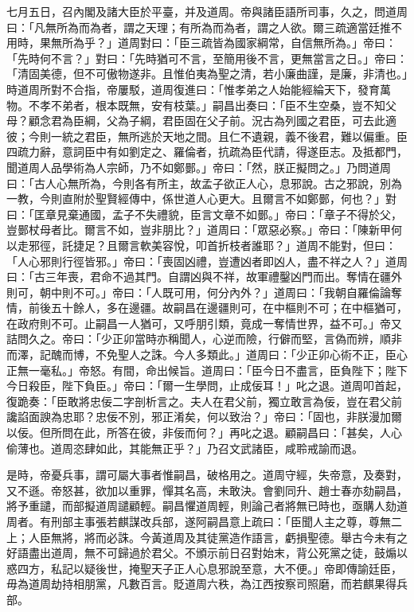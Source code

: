 \begin{pinyinscope}
七月五日，召內閣及諸大臣於平臺，并及道周。帝與諸臣語所司事，久之，問道周曰：「凡無所為而為者，謂之天理；有所為而為者，謂之人欲。爾三疏適當廷推不用時，果無所為乎？」道周對曰：「臣三疏皆為國家綱常，自信無所為。」帝曰：「先時何不言？」對曰：「先時猶可不言，至簡用後不言，更無當言之日。」帝曰：「清固美德，但不可傲物遂非。且惟伯夷為聖之清，若小廉曲謹，是廉，非清也。」時道周所對不合指，帝屢駁，道周復進曰：「惟孝弟之人始能經綸天下，發育萬物。不孝不弟者，根本既無，安有枝葉。」嗣昌出奏曰：「臣不生空桑，豈不知父母？顧念君為臣綱，父為子綱，君臣固在父子前。況古為列國之君臣，可去此適彼；今則一統之君臣，無所逃於天地之間。且仁不遺親，義不後君，難以偏重。臣四疏力辭，意詞臣中有如劉定之、羅倫者，抗疏為臣代請，得遂臣志。及抵都門，聞道周人品學術為人宗師，乃不如鄭鄤。」帝曰：「然，朕正擬問之。」乃問道周曰：「古人心無所為，今則各有所主，故孟子欲正人心，息邪說。古之邪說，別為一教，今則直附於聖賢經傳中，係世道人心更大。且爾言不如鄭鄤，何也？」對曰：「匡章見棄通國，孟子不失禮貌，臣言文章不如鄤。」帝曰：「章子不得於父，豈鄤杖母者比。爾言不如，豈非朋比？」道周曰：「眾惡必察。」帝曰：「陳新甲何以走邪徑，託捷足？且爾言軟美容悅，叩首折枝者誰耶？」道周不能對，但曰：「人心邪則行徑皆邪。」帝曰：「喪固凶禮，豈遭凶者即凶人，盡不祥之人？」道周曰：「古三年喪，君命不過其門。自謂凶與不祥，故軍禮鑿凶門而出。奪情在疆外則可，朝中則不可。」帝曰：「人既可用，何分內外？」道周曰：「我朝自羅倫論奪情，前後五十餘人，多在邊疆。故嗣昌在邊疆則可，在中樞則不可；在中樞猶可，在政府則不可。止嗣昌一人猶可，又呼朋引類，竟成一奪情世界，益不可。」帝又詰問久之。帝曰：「少正卯當時亦稱聞人，心逆而險，行僻而堅，言偽而辨，順非而澤，記醜而博，不免聖人之誅。今人多類此。」道周曰：「少正卯心術不正，臣心正無一毫私。」帝怒。有間，命出候旨。道周曰：「臣今日不盡言，臣負陛下；陛下今日殺臣，陛下負臣。」帝曰：「爾一生學問，止成佞耳！」叱之退。道周叩首起，復跪奏：「臣敢將忠佞二字剖析言之。夫人在君父前，獨立敢言為佞，豈在君父前讒諂面諛為忠耶？忠佞不別，邪正淆矣，何以致治？」帝曰：「固也，非朕漫加爾以佞。但所問在此，所答在彼，非佞而何？」再叱之退。顧嗣昌曰：「甚矣，人心偷薄也。道周恣肆如此，其能無正乎？」乃召文武諸臣，咸聆戒諭而退。

是時，帝憂兵事，謂可屬大事者惟嗣昌，破格用之。道周守經，失帝意，及奏對，又不遜。帝怒甚，欲加以重罪，憚其名高，未敢決。會劉同升、趙士春亦劾嗣昌，將予重譴，而部擬道周譴顧輕。嗣昌懼道周輕，則論己者將無已時也，亟購人劾道周者。有刑部主事張若麒謀改兵部，遂阿嗣昌意上疏曰：「臣聞人主之尊，尊無二上；人臣無將，將而必誅。今黃道周及其徒黨造作語言，虧損聖德。舉古今未有之好語盡出道周，無不可歸過於君父。不頒示前日召對始末，背公死黨之徒，鼓煽以惑四方，私記以疑後世，掩聖天子正人心息邪說至意，大不便。」帝即傳諭廷臣，毋為道周劫持相朋黨，凡數百言。貶道周六秩，為江西按察司照磨，而若麒果得兵部。


\end{pinyinscope}
